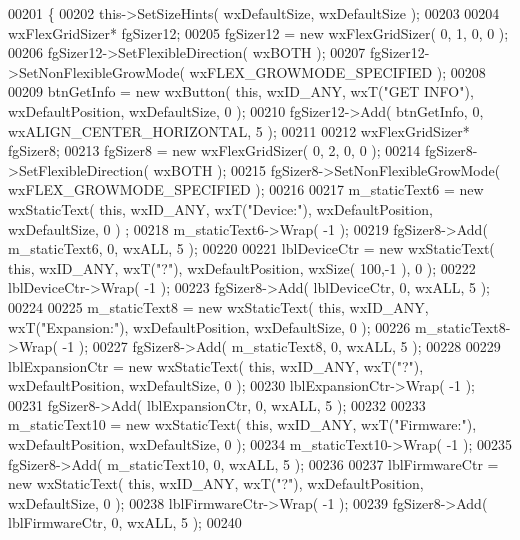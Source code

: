 \begin{DoxyCode}
00201 \{
00202     this->SetSizeHints( wxDefaultSize, wxDefaultSize );
00203     
00204     wxFlexGridSizer* fgSizer12;
00205     fgSizer12 = \textcolor{keyword}{new} wxFlexGridSizer( 0, 1, 0, 0 );
00206     fgSizer12->SetFlexibleDirection( wxBOTH );
00207     fgSizer12->SetNonFlexibleGrowMode( wxFLEX\_GROWMODE\_SPECIFIED );
00208     
00209     btnGetInfo = \textcolor{keyword}{new} wxButton( \textcolor{keyword}{this}, wxID\_ANY, wxT(\textcolor{stringliteral}{"GET INFO"}), wxDefaultPosition, wxDefaultSize, 0 );
00210     fgSizer12->Add( btnGetInfo, 0, wxALIGN\_CENTER\_HORIZONTAL, 5 );
00211     
00212     wxFlexGridSizer* fgSizer8;
00213     fgSizer8 = \textcolor{keyword}{new} wxFlexGridSizer( 0, 2, 0, 0 );
00214     fgSizer8->SetFlexibleDirection( wxBOTH );
00215     fgSizer8->SetNonFlexibleGrowMode( wxFLEX\_GROWMODE\_SPECIFIED );
00216     
00217     m_staticText6 = \textcolor{keyword}{new} wxStaticText( \textcolor{keyword}{this}, wxID\_ANY, wxT(\textcolor{stringliteral}{"Device:"}), wxDefaultPosition, wxDefaultSize, 0 )
      ;
00218     m_staticText6->Wrap( -1 );
00219     fgSizer8->Add( m_staticText6, 0, wxALL, 5 );
00220     
00221     lblDeviceCtr = \textcolor{keyword}{new} wxStaticText( \textcolor{keyword}{this}, wxID\_ANY, wxT(\textcolor{stringliteral}{"?"}), wxDefaultPosition, wxSize( 100,-1 ), 0 );
00222     lblDeviceCtr->Wrap( -1 );
00223     fgSizer8->Add( lblDeviceCtr, 0, wxALL, 5 );
00224     
00225     m_staticText8 = \textcolor{keyword}{new} wxStaticText( \textcolor{keyword}{this}, wxID\_ANY, wxT(\textcolor{stringliteral}{"Expansion:"}), wxDefaultPosition, wxDefaultSize, 
      0 );
00226     m_staticText8->Wrap( -1 );
00227     fgSizer8->Add( m_staticText8, 0, wxALL, 5 );
00228     
00229     lblExpansionCtr = \textcolor{keyword}{new} wxStaticText( \textcolor{keyword}{this}, wxID\_ANY, wxT(\textcolor{stringliteral}{"?"}), wxDefaultPosition, wxDefaultSize, 0 );
00230     lblExpansionCtr->Wrap( -1 );
00231     fgSizer8->Add( lblExpansionCtr, 0, wxALL, 5 );
00232     
00233     m_staticText10 = \textcolor{keyword}{new} wxStaticText( \textcolor{keyword}{this}, wxID\_ANY, wxT(\textcolor{stringliteral}{"Firmware:"}), wxDefaultPosition, wxDefaultSize, 
      0 );
00234     m_staticText10->Wrap( -1 );
00235     fgSizer8->Add( m_staticText10, 0, wxALL, 5 );
00236     
00237     lblFirmwareCtr = \textcolor{keyword}{new} wxStaticText( \textcolor{keyword}{this}, wxID\_ANY, wxT(\textcolor{stringliteral}{"?"}), wxDefaultPosition, wxDefaultSize, 0 );
00238     lblFirmwareCtr->Wrap( -1 );
00239     fgSizer8->Add( lblFirmwareCtr, 0, wxALL, 5 );
00240     

\end{DoxyCode}
